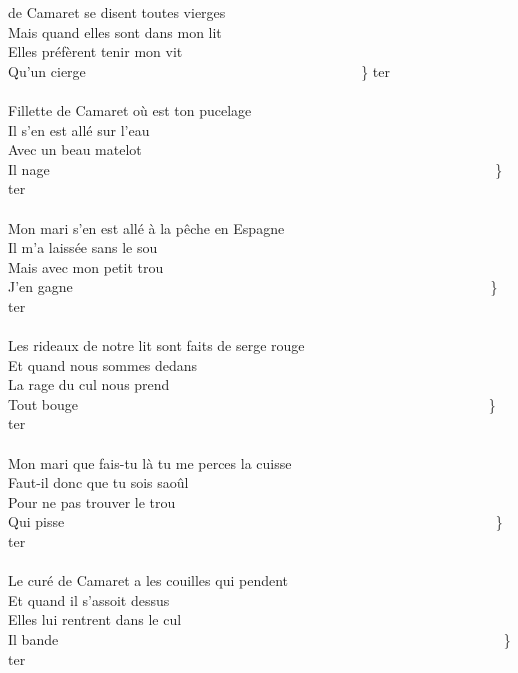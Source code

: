 
 de Camaret se disent toutes vierges \bissimple
\\Mais quand elles sont dans mon lit
\\Elles préfèrent tenir mon vit
\\Qu'un cierge ~~~~~~~~~~~~~~~~~~~~~~~~~~~~~~~~~~~~~~ \} ter
\\\\Fillette de Camaret où est ton pucelage ~~~~~~~~~~~~~~~~~~~~\bissimple
\\Il s'en est allé sur l'eau
\\Avec un beau matelot
\\Il nage ~~~~~~~~~~~~~~~~~~~~~~~~~~~~~~~~~~~~~~~~~~~~~~~~~~~~~~~~~~~~~~~\} ter
\\\\Mon mari s'en est allé à la pêche en Espagne ~~~~~~~~~~~~~\bissimple
\\Il m'a laissée sans le sou
\\Mais avec mon petit trou
\\J'en gagne ~~~~~~~~~~~~~~~~~~~~~~~~~~~~~~~~~~~~~~~~~~~~~~~~~~~~~~~~~~~\}  ter
\\\\Les rideaux de notre lit sont faits de serge rouge  ~~~~~~~~~\bissimple
\\Et quand nous sommes dedans
\\La rage du cul nous prend
\\Tout bouge ~~~~~~~~~~~~~~~~~~~~~~~~~~~~~~~~~~~~~~~~~~~~~~~~~~~~~~~~~~\} ter
\\\\Mon mari que fais-tu là tu me perces la cuisse  ~~~~~~~~~~~~\bissimple
\\Faut-il donc que tu sois saoûl
\\Pour ne pas trouver le trou
\\Qui pisse ~~~~~~~~~~~~~~~~~~~~~~~~~~~~~~~~~~~~~~~~~~~~~~~~~~~~~~~~~~~~~\} ter
\\\\Le curé de Camaret a les couilles qui pendent  ~~~~~~~~~~~~~\bissimple
\\Et quand il s'assoit dessus
\\Elles lui rentrent dans le cul
\\Il bande ~~~~~~~~~~~~~~~~~~~~~~~~~~~~~~~~~~~~~~~~~~~~~~~~~~~~~~~~~~~~~~~\} ter
